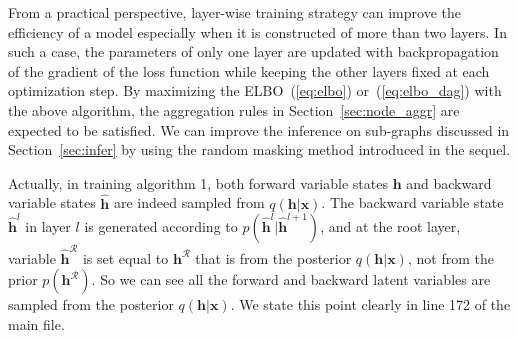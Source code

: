 \documentclass[twoside]{article}
\begin{document}
From a practical perspective, layer-wise training strategy can improve the efficiency of a model especially when it is constructed of more than two layers. 
In such a case, the parameters of only one layer are updated with backpropagation of the gradient of the loss function while keeping the other layers fixed at each optimization step. 
By maximizing the ELBO~(\ref{eq:elbo}) or~(\ref{eq:elbo_dag}) with the above algorithm, the aggregation rules in Section~\ref{sec:node_aggr} are expected to be satisfied. 
We can improve the inference on sub-graphs discussed in Section~\ref{sec:infer} by using the random masking method introduced in the sequel.



Actually, in training algorithm 1, both forward variable states $\mathbf{h}$ and backward variable states  $\widehat{\mathbf{h}}$ are indeed sampled from $q(\mathbf{h}|\mathbf{x})$. The backward variable state $\widehat{\mathbf{h}}^l$ in  layer $l$  is generated according to $p(\widehat{\mathbf{h}}^l | \widehat{\mathbf{h}}^{l+1})$, and at the root  layer,  variable $\widehat{\mathbf{h}}^{\mathcal{R}}$ is set  equal to  $\mathbf{h}^{\mathcal{R}}$ that is
from  the posterior $q(\mathbf{h}|\mathbf{x})$, not from the prior $p(\mathbf{h}^{\mathcal{R}})$. So we can see all the forward and backward latent variables are sampled from the posterior $q(\mathbf{h}|\mathbf{x})$. 
We state this point clearly in line 172 of the main file.





\vspace{-0.1in}
\end{document}

